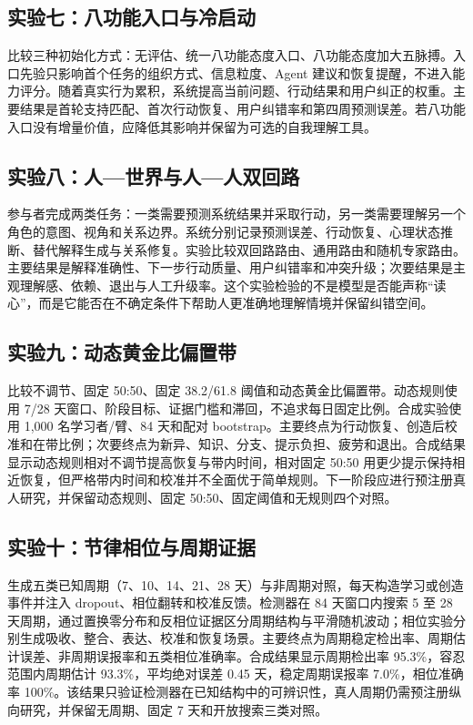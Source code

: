 \documentclass[UTF8,a4paper,11pt]{ctexart}
\begin{document}
\subsection{实验七：八功能入口与冷启动}

比较三种初始化方式：无评估、统一八功能态度入口、八功能态度加大五脉搏。入口先验只影响首个任务的组织方式、信息粒度、Agent 建议和恢复提醒，不进入能力评分。随着真实行为累积，系统提高当前问题、行动结果和用户纠正的权重。主要结果是首轮支持匹配、首次行动恢复、用户纠错率和第四周预测误差。若八功能入口没有增量价值，应降低其影响并保留为可选的自我理解工具。

\subsection{实验八：人—世界与人—人双回路}

参与者完成两类任务：一类需要预测系统结果并采取行动，另一类需要理解另一个角色的意图、视角和关系边界。系统分别记录预测误差、行动恢复、心理状态推断、替代解释生成与关系修复。实验比较双回路路由、通用路由和随机专家路由。主要结果是解释准确性、下一步行动质量、用户纠错率和冲突升级；次要结果是主观理解感、依赖、退出与人工升级率。这个实验检验的不是模型是否能声称“读心”，而是它能否在不确定条件下帮助人更准确地理解情境并保留纠错空间。

\subsection{实验九：动态黄金比偏置带}

比较不调节、固定 50:50、固定 38.2/61.8 阈值和动态黄金比偏置带。动态规则使用 7/28 天窗口、阶段目标、证据门槛和滞回，不追求每日固定比例。合成实验使用 1,000 名学习者/臂、84 天和配对 bootstrap。主要终点为行动恢复、创造后校准和在带比例；次要终点为新异、知识、分支、提示负担、疲劳和退出。合成结果显示动态规则相对不调节提高恢复与带内时间，相对固定 50:50 用更少提示保持相近恢复，但严格带内时间和校准并不全面优于简单规则。下一阶段应进行预注册真人研究，并保留动态规则、固定 50:50、固定阈值和无规则四个对照。

\subsection{实验十：节律相位与周期证据}

生成五类已知周期（7、10、14、21、28 天）与非周期对照，每天构造学习或创造事件并注入 dropout、相位翻转和校准反馈。检测器在 84 天窗口内搜索 5 至 28 天周期，通过置换零分布和反相位证据区分周期结构与平滑随机波动；相位实验分别生成吸收、整合、表达、校准和恢复场景。主要终点为周期稳定检出率、周期估计误差、非周期误报率和五类相位准确率。合成结果显示周期检出率 95.3\%，容忍范围内周期估计 93.3\%，平均绝对误差 0.45 天，稳定周期误报率 7.0\%，相位准确率 100\%。该结果只验证检测器在已知结构中的可辨识性，真人周期仍需预注册纵向研究，并保留无周期、固定 7 天和开放搜索三类对照。
\end{document}
